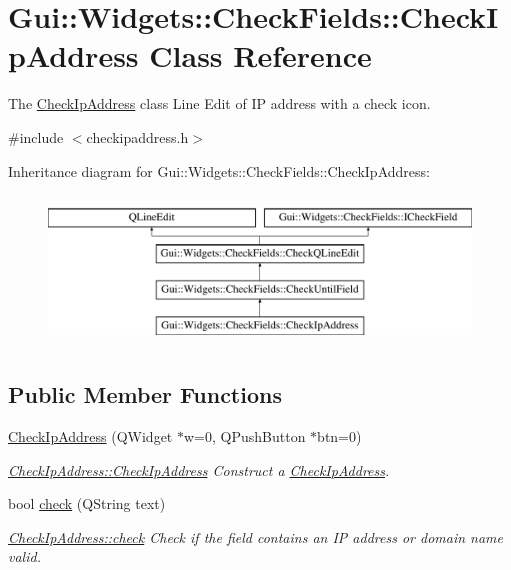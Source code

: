 \hypertarget{classGui_1_1Widgets_1_1CheckFields_1_1CheckIpAddress}{}\section{Gui\+:\+:Widgets\+:\+:Check\+Fields\+:\+:Check\+Ip\+Address Class Reference}
\label{classGui_1_1Widgets_1_1CheckFields_1_1CheckIpAddress}


The \hyperlink{classGui_1_1Widgets_1_1CheckFields_1_1CheckIpAddress}{Check\+Ip\+Address} class Line Edit of I\+P address with a check icon.  




{\ttfamily \#include $<$checkipaddress.\+h$>$}

Inheritance diagram for Gui\+:\+:Widgets\+:\+:Check\+Fields\+:\+:Check\+Ip\+Address\+:\begin{figure}[H]
\begin{center}
\leavevmode
\includegraphics[height=4.000000cm]{db/d70/classGui_1_1Widgets_1_1CheckFields_1_1CheckIpAddress}
\end{center}
\end{figure}
\subsection*{Public Member Functions}
\begin{DoxyCompactItemize}
\item 
\hyperlink{classGui_1_1Widgets_1_1CheckFields_1_1CheckIpAddress_a0ea8ece5cd108b1ac372e4753a36377e}{Check\+Ip\+Address} (Q\+Widget $\ast$w=0, Q\+Push\+Button $\ast$btn=0)
\begin{DoxyCompactList}\small\item\em \hyperlink{classGui_1_1Widgets_1_1CheckFields_1_1CheckIpAddress_a0ea8ece5cd108b1ac372e4753a36377e}{Check\+Ip\+Address\+::\+Check\+Ip\+Address} Construct a \hyperlink{classGui_1_1Widgets_1_1CheckFields_1_1CheckIpAddress}{Check\+Ip\+Address}. \end{DoxyCompactList}\item 
bool \hyperlink{classGui_1_1Widgets_1_1CheckFields_1_1CheckIpAddress_a785f3ccf0fba4db3e83bfaaaea37455e}{check} (Q\+String text)
\begin{DoxyCompactList}\small\item\em \hyperlink{classGui_1_1Widgets_1_1CheckFields_1_1CheckIpAddress_a785f3ccf0fba4db3e83bfaaaea37455e}{Check\+Ip\+Address\+::check} Check if the field contains an I\+P address or domain name valid. \end{DoxyCompactList}\end{DoxyCompactItemize}

